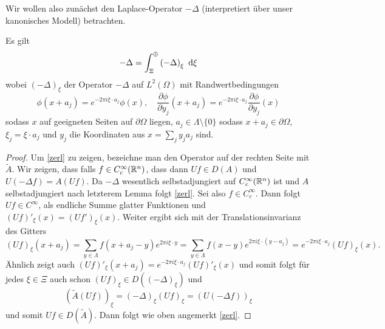 \documentclass{mywork}
\begin{document}
Wir wollen also zunächst den Laplace-Operator $-\Delta$ (interpretiert über unser kanonisches Modell) betrachten.
\begin{lem}\label{laplace}
Es gilt
\begin{equation}\label{zerl}
- \Delta = \int_{\Xi}^\oplus \left ( - \Delta \right )_\xi\, \dx[\xi]
\end{equation}
wobei $(-\Delta)_\xi$ der Operator $- \Delta$ auf $L^2(\Omega)$ mit Randwertbedingungen
$$
\phi(x+a_j)=e^{-2\pi i\xi\cdot a_j} \phi(x), \quad \frac{\partial \phi}{\partial y_j} (x+a_j) = e^{-2\pi i \xi\cdot a_j} \frac{\partial \phi}{\partial y_j} (x)
$$
sodass $x$ auf geeigneten Seiten auf $\partial \Omega$ liegen, $a_j\in \Lambda\setminus\{0\}$ sodass $x+a_j\in \partial \Omega$, $\xi_j= \xi \cdot a_j$ und $y_j$ die Koordinaten aus $x= \sum_j y_j a_j$ sind.
\end{lem}

\begin{proof}
Um \eqref{zerl} zu zeigen, bezeichne man den Operator auf der rechten Seite mit $\tilde A$. Wir zeigen, dass falls $f\in C_c^\infty(\R^n)$, dass dann $Uf\in D(A)$ und $U(- \Delta f)= A(Uf)$.  Da $-\Delta$ wesentlich selbstadjungiert auf $C_c^\infty(\R^n)$ ist und $A$ selbstadjungiert nach letzterem Lemma folgt \eqref{zerl}.  Sei also $f\in C_c^\infty$. Dann folgt $Uf\in C^\infty$, als endliche Summe glatter Funktionen und $(Uf)'_\xi (x) = (Uf')_\xi (x)$.  Weiter ergibt sich mit der Translationsinvarianz des Gitters
\[
(Uf)_\xi (x+a_j) = \sum_{y\in \Lambda}  f(x+ a_j-y)e^{2\pi i \xi \cdot y}= \sum_{y\in \Lambda}  f(x-y) e^{2\pi i \xi \cdot (y-a_j)}= e^{-2\pi i\xi\cdot a_j} (Uf)_\xi (x).
\]  
Ähnlich zeigt auch $(Uf)'_\xi (x+a_j) = e^{-2\pi i \xi \cdot a_j} (Uf)'_\xi (x)$ und somit folgt für jedes $\xi \in \Xi$ auch schon $(Uf)_\xi \in D((-\Delta)_\xi )$ und
\[
(\tilde A(Uf))_\xi=\left ( - \Delta \right )_\xi (Uf)_\xi = (U(- \Delta f))_\xi
\]
und somit $Uf \in D(\tilde A)$. Dann folgt wie oben angemerkt \eqref{zerl}.
\end{proof}
\end{document}
